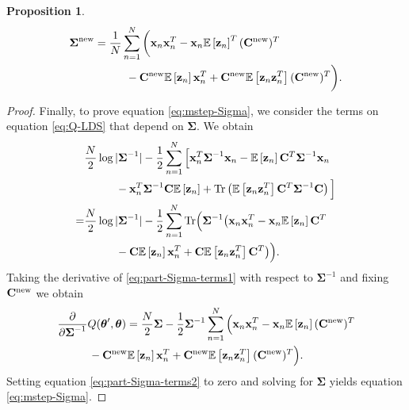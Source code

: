 \documentclass[12pt, oneside]{book}
\numberwithin{equation}{section}
\newcommand{\expectation}[1]{\mathbb{E}\left[#1\right]}
\newcommand{\Tr}[1]{\text{Tr}\left(#1\right)}
\newcommand{\x}{{\bf x}}
\newcommand{\z}{{\bf z}}
\newtheorem{proposition}{Proposition}[section]
\begin{document}
{\begin{proposition}
	\begin{align}
		\boldsymbol{\Sigma}^{\text{\normalfont new}} &= \frac{1}{N}\sum_{n=1}^N\bigg(\x_n\x_n^T - \x_n \expectation{\z_n}^T ({\bf C}^{\text{\normalfont new}})^T \nonumber\\
		&\hspace{1cm} - {\bf C}^{\text{\normalfont new}}\expectation{\z_n}\x_n^T + {\bf C}^{\text{\normalfont new}} \expectation{\z_n \z_n^T}({\bf C}^{\text{\normalfont new}})^T \bigg). \label{eq:mstep-Sigma}
	\end{align}
\end{proposition}



\begin{proof}
	Finally, to prove equation \eqref{eq:mstep-Sigma}, we consider the terms on equation \eqref{eq:Q-LDS} that depend on $\boldsymbol{\Sigma}$. We obtain
	\begin{align}
		 & \frac{N}{2}\log\vert\boldsymbol\Sigma^{-1}\vert -\frac{1}{2}\sum_{n=1}^N \Big[ \x_n^T \boldsymbol{\Sigma}^{-1}\x_n - \expectation{\z_n}{\bf C}^T\boldsymbol{\Sigma}^{-1}\x_n \nonumber\\
		 &\hspace{1cm}- \x_n^T \boldsymbol{\Sigma}^{-1}{\bf C}\expectation{\z_n} + \Tr{\expectation{\z_n\z_n^T}{\bf C}^T\boldsymbol{\Sigma}^{-1}{\bf C}} \Big]\\
		=& \frac{N}{2}\log\vert\boldsymbol\Sigma^{-1}\vert -\frac{1}{2}\sum_{n=1}^N\text{Tr}\Big(\boldsymbol\Sigma^{-1} \big(\x_n\x_n^T - \x_n\expectation{\z_n}{\bf C}^T \nonumber\\
		&\hspace{1cm}- {\bf C}\expectation{\z_n}\x_n^T + {\bf C}\expectation{\z_n\z_n^T}{\bf C}^T\big)\Big). \label{eq:part-Sigma-terms1}
	\end{align}	
	Taking the derivative of \eqref{eq:part-Sigma-terms1} with respect to $\boldsymbol{\Sigma}^{-1}$ and fixing ${\bf C}^{\text{new}}$ we obtain
	\begin{align}
		&\frac{\partial}{\partial \boldsymbol{\Sigma}^{-1}} Q(\boldsymbol\theta', \boldsymbol\theta) = \frac{N}{2}\boldsymbol{\Sigma} - \frac{1}{2}\boldsymbol\Sigma^{-1}\sum_{n=1}^N\Big( \x_n\x_n^T - \x_n\expectation{\z_n}({\bf C}^{\text{new}})^T \nonumber\\
			&\hspace{1cm}- {\bf C}^{\text{new}}\expectation{\z_n}\x_n^T + {\bf C}^{\text{new}}\expectation{\z_n\z_n^T}({\bf C}^{\text{new}})^T \Big) \label{eq:part-Sigma-terms2}.
	\end{align}
	Setting equation \eqref{eq:part-Sigma-terms2} to zero and solving for $\boldsymbol{\Sigma}$ yields equation \eqref{eq:mstep-Sigma}.
\end{proof}


}
\end{document}
